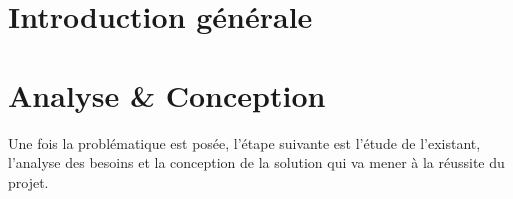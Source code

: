 \documentclass[12pt,a4paper,twoside]{report}
\begin{document}
	\newpage

	\chapter*{Introduction générale}
	\label{chap:introduction}{
		

	 }
		
	\newpage
	
	\chapter{Analyse \& Conception}{
		Une fois la problématique est posée, l’étape suivante est l’étude de l’existant, l’analyse des besoins et la conception de la solution qui va mener à la réussite du projet.
	\newpage
	}
\end{document}
